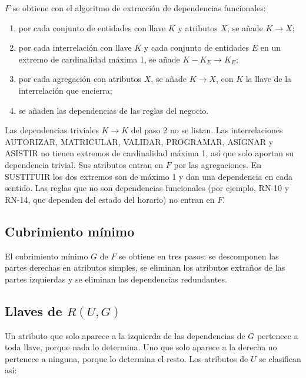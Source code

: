 $F$ se obtiene con el algoritmo de extracción de dependencias funcionales:
\begin{enumerate}[label=\arabic*.]
  \item por cada conjunto de entidades con llave $K$ y atributos $X$, se añade $K \to X$;
  \item por cada interrelación con llave $K$ y cada conjunto de entidades $E$ en un extremo de cardinalidad máxima 1, se añade $K - K_E \to K_E$;
  \item por cada agregación con atributos $X$, se añade $K \to X$, con $K$ la llave de la interrelación que encierra;
  \item se añaden las dependencias de las reglas del negocio.
\end{enumerate}
Las dependencias triviales $K \to K$ del paso 2 no se listan. Las interrelaciones AUTORIZAR, MATRICULAR, VALIDAR, PROGRAMAR, ASIGNAR y ASISTIR no tienen extremos de cardinalidad máxima 1, así que solo aportan su dependencia trivial. Sus atributos entran en $F$ por las agregaciones. En SUSTITUIR los dos extremos son de máximo 1 y dan una dependencia en cada sentido. Las reglas que no son dependencias funcionales (por ejemplo, RN-10 y RN-14, que dependen del estado del horario) no entran en $F$.



\subsection{Cubrimiento mínimo}

El cubrimiento mínimo $G$ de $F$ se obtiene en tres pasos: se descomponen las partes derechas en atributos simples, se eliminan los atributos extraños de las partes izquierdas y se eliminan las dependencias redundantes.



\subsection{Llaves de \texorpdfstring{$R(U, G)$}{R(U, G)}}

Un atributo que solo aparece a la izquierda de las dependencias de $G$ pertenece a toda llave, porque nada lo determina. Uno que solo aparece a la derecha no pertenece a ninguna, porque lo determina el resto. Los atributos de $U$ se clasifican así:



